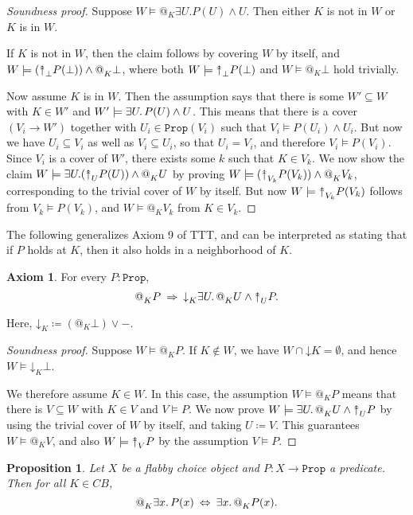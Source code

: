 \documentclass[11pt, oneside, article]{memoir}
\makeatletter
\theoremstyle{plain}
\newtheorem{proposition}[theorem]{Proposition}
\theoremstyle{definition}
\newtheorem{axiom}{Axiom}
\theoremstyle{remark}
\newenvironment{soundproof}{\begin{proof}[Soundness proof]}{\end{proof}}
\newcommand{\const}[1]{\mathtt{#1}}
\newcommand{\Prop}{\const{Prop}}
\newcommand{\BaseSpace}{B}
\newcommand{\AtSymbol}{{@}}
\newcommand{\SeeSymbol}{{\down}}  %
\newcommand{\InSymbol}{{\upclose}}%
\newcommand{\At}[2][]{\AtSymbol^{#1}_{#2}}
\newcommand{\See}[2][]{\SeeSymbol^{#1}_{#2}}
\newcommand{\In}[2][]{\InSymbol^{#1}_{#2}}
\newcommand{\upclose}{{\rotatebox[origin=c]{90}{$\twoheadrightarrow$}}}
\newcommand{\down}{\mathord{\downarrow}}
\newcommand{\imp}{\Rightarrow}
\makeatother
\begin{document}
\begin{soundproof}
    Suppose $W \models @_K \exists U. P(U) \wedge U$. Then either $K$ is not in $W$ or $K$ is in $W$.

    If $K$ is not in $W$, then the claim follows by covering $W$ by itself, and $W \models (\In{\bot} P(\bot)) \wedge \At{K} \bot$, where both $W \models \In{\bot} P(\bot)$ and $W \models \At{K} \bot$ hold trivially.

    Now assume $K$ is in $W$. Then the assumption says that there is some $W'\subseteq W$ with $K\in W'$ and $W' \models \exists U\ldotp P(U) \wedge U$. This means that there is a cover $(V_i\to W')$ together with $U_i\in\Prop(V_i)$ such that $V_i \models P(U_i) \wedge U_i$. But now we have $U_i \subseteq V_i$ as well as $V_i \subseteq U_i$, so that $U_i = V_i$, and therefore $V_i \models P(V_i)$. Since $V_i$ is a cover of $W'$, there exists some $k$ such that $K \in V_k$. We now show the claim $W \models \exists U. (\In{U} P(U)) \wedge \At{K} U$ by proving $W \models (\In{V_k} P(V_k)) \wedge \At{K} V_k$, corresponding to the trivial cover of $W$ by itself. But now $W \models \In{V_k} P(V_k)$ follows from $V_k \models P(V_k)$, and $W \models \At{K} V_k$ from $K\in V_k$.
\end{soundproof}

The following generalizes Axiom 9 of TTT, and can be interpreted as stating that if $P$ holds at $K$, then it also holds in a neighborhood of $K$.

\begin{axiom}\label{ax.at_to_nghbhd}
For every $P : \Prop$,
\[
	\At{K} P \: \imp \: \See{K} \exists U\ldotp \At{K} U \wedge \In{U} P.
\]
\end{axiom}

Here, $\See{K} \coloneqq (\At{K} \bot) \vee -$.

\begin{soundproof}
Suppose $W \models \At{K} P$. If $K\not\in W$, we have $W \cap \down K = \emptyset$, and hence $W \models \See{K} \bot$.

We therefore assume $K\in W$. In this case, the assumption $W \models \At{K} P$ means that there is $V\subseteq W$ with $K\in V$ and $V \models P$. We now prove $W \models \exists U\ldotp \At{K} U \wedge \In{U} P$ by using the trivial cover of $W$ by itself, and taking $U \coloneqq V$. This guarantees $W \models \At{K} V$, and also $W \models \In{V} P$ by the assumption $V \models P$.
\end{soundproof}

\begin{proposition}
Let $X$ be a flabby choice object and $P : X \to \Prop$ a predicate. Then for all $K \in C\BaseSpace$,
\[
	\At{K} \exists x\ldotp P(x) \: \Leftrightarrow \: \exists x\ldotp \At{K} P(x).
\]
\end{proposition}
\end{document}

